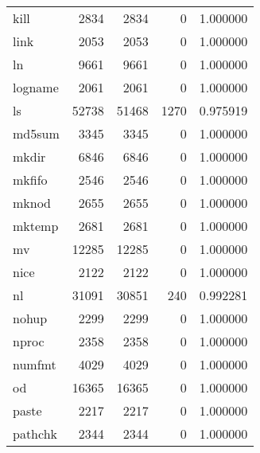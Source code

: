 \begin{tabular}{lrrrr}
kill      &                     2834 &         2834 &             0 &                 1.000000 \\
link      &                     2053 &         2053 &             0 &                 1.000000 \\
ln        &                     9661 &         9661 &             0 &                 1.000000 \\
logname   &                     2061 &         2061 &             0 &                 1.000000 \\
ls        &                    52738 &        51468 &          1270 &                 0.975919 \\
md5sum    &                     3345 &         3345 &             0 &                 1.000000 \\
mkdir     &                     6846 &         6846 &             0 &                 1.000000 \\
mkfifo    &                     2546 &         2546 &             0 &                 1.000000 \\
mknod     &                     2655 &         2655 &             0 &                 1.000000 \\
mktemp    &                     2681 &         2681 &             0 &                 1.000000 \\
mv        &                    12285 &        12285 &             0 &                 1.000000 \\
nice      &                     2122 &         2122 &             0 &                 1.000000 \\
nl        &                    31091 &        30851 &           240 &                 0.992281 \\
nohup     &                     2299 &         2299 &             0 &                 1.000000 \\
nproc     &                     2358 &         2358 &             0 &                 1.000000 \\
numfmt    &                     4029 &         4029 &             0 &                 1.000000 \\
od        &                    16365 &        16365 &             0 &                 1.000000 \\
paste     &                     2217 &         2217 &             0 &                 1.000000 \\
pathchk   &                     2344 &         2344 &             0 &                 1.000000 \\

\end{tabular}
